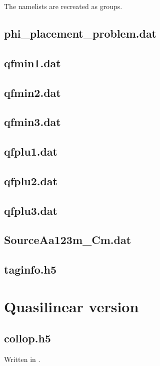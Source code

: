 The namelists are recreated as groups.

\subsection{phi\_placement\_problem.dat}

\subsection{qfmin1.dat}
\subsection{qfmin2.dat}
\subsection{qfmin3.dat}
\subsection{qfplu1.dat}
\subsection{qfplu2.dat}
\subsection{qfplu3.dat}

\subsection{SourceAa123m\_Cm.dat}

\subsection{taginfo.h5}

\section{Quasilinear version}

\subsection{collop.h5}
Written in .

